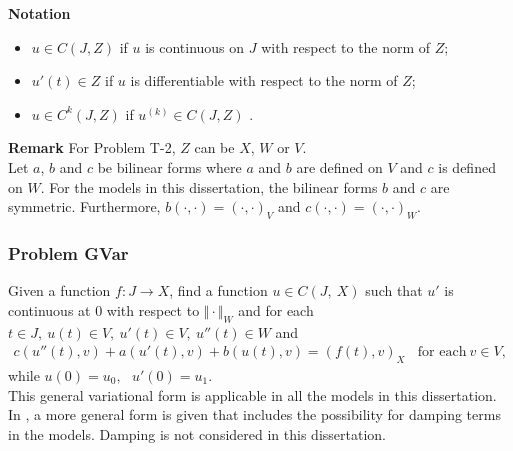 \documentclass[../../main.tex]{subfiles}
\begin{document}
\textbf{Notation}
\begin{itemize}
	\item[] $u\in C(J,Z)$ if $u$ is continuous on $J$ with respect to the norm of $Z$;

	\item[] $u'(t)\in Z$ if $u$ is differentiable with respect to the norm of $Z$;

	\item[] $u\in C^{k}(J,Z)$ if $u^{(k)}\in C(J,Z)$ .
\end{itemize}

\textbf{Remark} For Problem T-2, $Z$ can be $X$, $W$ or $V$.\\

Let $a$, $b$ and $c$ be bilinear forms where $a$ and $b$ are defined on $V$ and $c$ is defined on $W$. For the models in this dissertation, the bilinear forms $b$ and $c$ are symmetric. Furthermore, $b(\cdot, \cdot) = (\cdot, \cdot)_V$ and $c(\cdot, \cdot) = (\cdot, \cdot)_W$.


\subsubsection*{Problem GVar}\label{sssec:existence:ProblemGVar}
Given a function $f:J\rightarrow X$, find a function $u\in C(J,\ X)$ such that $u'$ is continuous at $0$ with respect to $\Vert \cdot \Vert_{W}$ and for each $t\in J,\ u(t)\in V,\ u'(t) \in V,\ u''(t)\in W$ and
\begin{eqnarray}
	c(u''(t),v)+a(u'(t),v)+b(u(t),v)= (f(t),v)_{X} \ \ \ \ \textrm{for each} \ v \in V, \label{eq:existence:ProblemGVar}
\end{eqnarray}
while $u(0)=u_{0},\ \ \ u'(0)=u_{1}$.\label{sym:a} \\

This general variational form is applicable in all the models in this dissertation. In \cite{VV02}, a more general form is given that includes the possibility for damping terms in the models. Damping is not considered in this dissertation.
\end{document}
